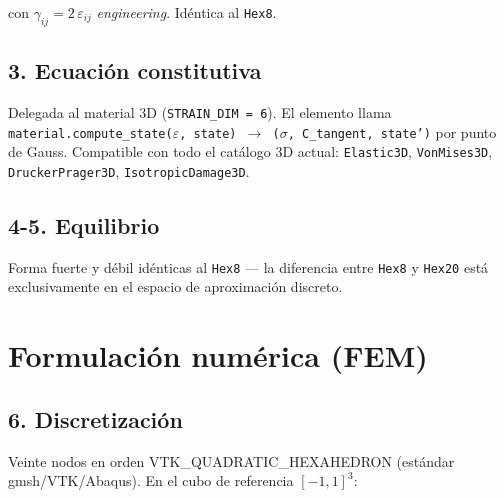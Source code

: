 \documentclass[11pt,letterpaper,oneside]{report}
\begin{document}
con $\gamma_{ij} = 2\,\varepsilon_{ij}$ \textit{engineering}. Idéntica al \texttt{Hex8}.

\subsection{3. Ecuación constitutiva}

Delegada al material 3D (\texttt{STRAIN\_DIM = 6}). El elemento llama \texttt{material.compute\_state(\ensuremath{\varepsilon}, state) \ensuremath{\to} (\ensuremath{\sigma}, C\_tangent, state')} por punto de Gauss. Compatible con todo el catálogo 3D actual: \texttt{Elastic3D}, \texttt{VonMises3D}, \texttt{DruckerPrager3D}, \texttt{IsotropicDamage3D}.

\subsection{4-5. Equilibrio}

Forma fuerte y débil idénticas al \texttt{Hex8} --- la diferencia entre \texttt{Hex8} y \texttt{Hex20} está exclusivamente en el espacio de aproximación discreto.


\section{Formulación numérica (FEM)}

\subsection{6. Discretización}

Veinte nodos en orden VTK\_QUADRATIC\_HEXAHEDRON (estándar gmsh/VTK/Abaqus). En el cubo de referencia $[-1, 1]^3$:
\end{document}
